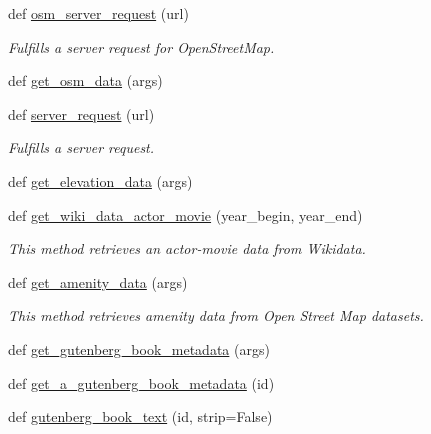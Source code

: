 \begin{DoxyCompactItemize}
def \hyperlink{namespacebridges_1_1data__src__dependent_1_1data__source_a5644517c9ee0f5ab9e59a4f4d64fa038}{osm\+\_\+server\+\_\+request} (url)
\begin{DoxyCompactList}\small\item\em Fulfills a server request for Open\+Street\+Map. \end{DoxyCompactList}\item 
def \hyperlink{namespacebridges_1_1data__src__dependent_1_1data__source_acbb9052453e120b99ac32b27fd99bb07}{get\+\_\+osm\+\_\+data} (args)
\item 
def \hyperlink{namespacebridges_1_1data__src__dependent_1_1data__source_a1b4461e2564ec55001104bd9bf45e252}{server\+\_\+request} (url)
\begin{DoxyCompactList}\small\item\em Fulfills a server request. \end{DoxyCompactList}\item 
def \hyperlink{namespacebridges_1_1data__src__dependent_1_1data__source_a5193a0d8e1507b1cedb5de65f1d702bd}{get\+\_\+elevation\+\_\+data} (args)
\item 
def \hyperlink{namespacebridges_1_1data__src__dependent_1_1data__source_a15db0d52db8b6e096db60f99b2f0171d}{get\+\_\+wiki\+\_\+data\+\_\+actor\+\_\+movie} (year\+\_\+begin, year\+\_\+end)
\begin{DoxyCompactList}\small\item\em This method retrieves an actor-\/movie data from Wikidata. \end{DoxyCompactList}\item 
def \hyperlink{namespacebridges_1_1data__src__dependent_1_1data__source_a98f06111d9c824dbbe49a44e002ceed5}{get\+\_\+amenity\+\_\+data} (args)
\begin{DoxyCompactList}\small\item\em This method retrieves amenity data from Open Street Map datasets. \end{DoxyCompactList}\item 
def \hyperlink{namespacebridges_1_1data__src__dependent_1_1data__source_aa0596e45a60ae4cc26f3dd11c88e16e6}{get\+\_\+gutenberg\+\_\+book\+\_\+metadata} (args)
\item 
def \hyperlink{namespacebridges_1_1data__src__dependent_1_1data__source_ad2c9b88363f20559561efb674d529659}{get\+\_\+a\+\_\+gutenberg\+\_\+book\+\_\+metadata} (id)
\item 
def \hyperlink{namespacebridges_1_1data__src__dependent_1_1data__source_aba6d278e54becccd64faa8dcd8eb7a92}{gutenberg\+\_\+book\+\_\+text} (id, strip=False)
\end{DoxyCompactItemize}
